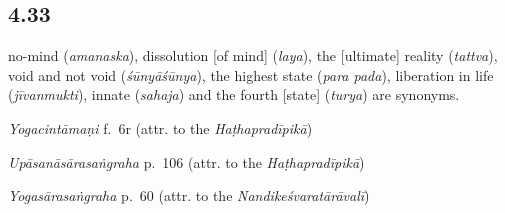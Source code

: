 \begin{ekdosis}

\subsection*{4.33}
\begin{translation}[hp04_033]
[\dots]  no-mind (\emph{amanaska}), dissolution [of mind] (\emph{laya}), the [ultimate] reality (\emph{tattva}), void and not void (\textit{śūnyāśūnya}), the highest state (\emph{para pada}), liberation in life (\emph{jīvanmukti}), innate (\emph{sahaja}) and the fourth [state] (\emph{turya}) are synonyms.
\end{translation}
% 

\begin{sources}[hp04_033]
\emph{Yogacintāmaṇi} f.~6r (attr. to the \emph{Haṭhapradīpikā})
\begin{versinnote}
\end{versinnote}

\emph{Upāsanāsārasaṅgraha} p.~106 (attr. to the \emph{Haṭhapradīpikā})
\begin{versinnote}
\end{versinnote}

\emph{Yogasārasaṅgraha} p.~60 (attr. to the \emph{Nandikeśvaratārāvalī})
\begin{versinnote}
\end{versinnote}
\end{sources}




\end{ekdosis}
